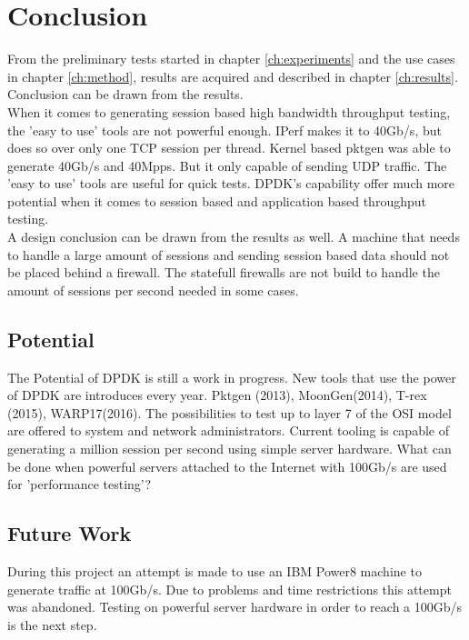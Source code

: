 \chapter{Conclusion}\label{ch:conclusion}
From the preliminary tests started in chapter \ref{ch:experiments} and the use cases in chapter \ref{ch:method}, results are acquired and described in chapter \ref{ch:results}.
Conclusion can be drawn from the results. \\
When it comes to generating session based high bandwidth throughput testing, the 'easy to use' tools are not powerful enough. IPerf makes it to 40Gb/s, but does so over only one TCP session per thread. 
Kernel based pktgen was able to generate 40Gb/s and 40Mpps. But it only capable of sending UDP traffic. 
The 'easy to use' tools are useful for quick tests.
DPDK's capability offer much more potential when it comes to session based and application based throughput testing. \\ 

A design conclusion can be drawn from the results as well. A machine that needs to handle a large amount of sessions and sending session based data should not be placed behind a firewall.
The statefull firewalls are not build to handle the amount of sessions per second needed in some cases.  



\section{Potential}
The Potential of DPDK is still a work in progress. New tools that use the power of DPDK are introduces every year.
Pktgen (2013), MoonGen(2014), T-rex (2015), WARP17(2016).
The possibilities to test up to layer 7 of the OSI model are offered to system and network administrators. 
Current tooling is capable of generating a million session per second using simple server hardware. 
What can be done when powerful servers attached to the Internet with 100Gb/s are used for 'performance testing'?  

\section{Future Work}
During this project an attempt is made to use an IBM Power8 machine to generate traffic at 100Gb/s. Due to problems and time restrictions this attempt was abandoned.
Testing on powerful server hardware in order to reach a 100Gb/s is the next step. 

